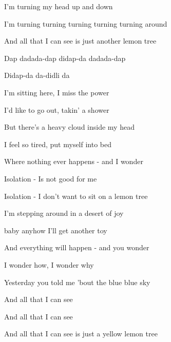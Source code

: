 \begin{song}
\begin{chorusbox}{\Chorus}
\bigskip

I'm turning my head up and down \par
I'm turning turning turning turning turning around \par
And all that I can see is just another lemon tree  \par
\end{chorusbox}

\bigskip

Dap  dadada-dap didap-da dadada-dap \par
{}Didap-da  da-didli da   \par

\bigskip

I'm sitting here, I miss the power \par
I'd like to go out, takin' a shower \par
But there's a heavy cloud inside my head \par
I feel so tired, put myself into bed \par
Where nothing ever happens -  and I wonder   \par

\bigskip

 Isolation - Is not good for me \par
{} Isolation - I don't want to  sit on a lemon tree \par

\bigskip

I'm stepping around in a desert of joy \par
{}baby anyhow I'll get another toy \par
And everything will happen -  and you wonder   \par

\bigskip

\Chorus

\bigskip

I wonder how, I wonder why \par
{}Yesterday you told me 'bout the blue blue sky \par
And all that I can see \par
And all that I can see \par
And all that I can see is just a yellow lemon tree \par

\end{song}
